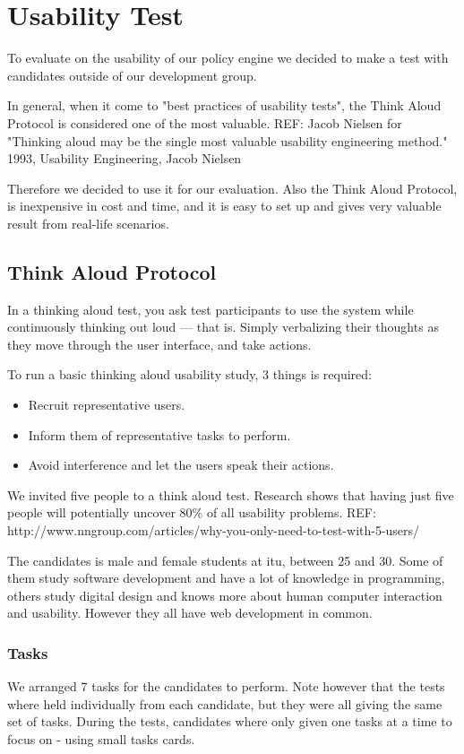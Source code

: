 \section{Usability Test}
\label{usability-test}
To evaluate on the usability of our policy engine we decided to make a test with candidates outside of our development group.

In general, when it come to "best practices of usability tests", the Think Aloud Protocol is considered one of the most valuable. REF: Jacob Nielsen for  "Thinking aloud may be the single most valuable usability engineering method." 1993, Usability Engineering, Jacob Nielsen

Therefore we decided to use it for our evaluation. Also the Think Aloud Protocol, is inexpensive in cost and time, and it is easy to set up and gives very valuable result from real-life scenarios. 

\subsection{Think Aloud Protocol}
In a thinking aloud test, you ask test participants to use the system while continuously thinking out loud — that is. Simply verbalizing their thoughts as they move through the user interface, and take actions.

To run a basic thinking aloud usability study, 3 things is required:
\begin{itemize}
\item Recruit representative users.
\item Inform them of representative tasks to perform. %
\item Avoid interference and let the users speak their actions.
\end{itemize}

We invited five people to a think aloud test. Research shows that having just five people will potentially uncover 80\% of all usability problems.
REF: http://www.nngroup.com/articles/why-you-only-need-to-test-with-5-users/

The candidates is male and female students at itu, between 25 and 30. Some of them study software development and have a lot of knowledge in programming, others study digital design and knows more about human computer interaction and usability. However they all have web development in common.

\subsubsection{Tasks}
We arranged 7 tasks for the candidates to perform.  Note however that the tests where held individually from each candidate, but they were all giving the same set of tasks. 
During the tests, candidates where only given one tasks at a time to focus on - using small tasks cards.


